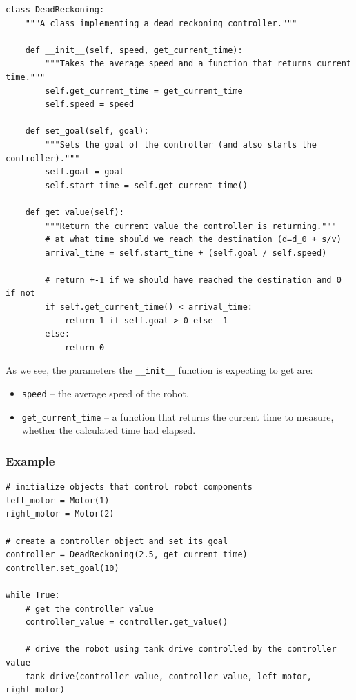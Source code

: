 \documentclass[12pt,twoside]{article}
\begin{document}
\begin{verbatim}
class DeadReckoning:
    """A class implementing a dead reckoning controller."""

    def __init__(self, speed, get_current_time):
        """Takes the average speed and a function that returns current time."""
        self.get_current_time = get_current_time
        self.speed = speed

    def set_goal(self, goal):
        """Sets the goal of the controller (and also starts the controller)."""
        self.goal = goal
        self.start_time = self.get_current_time()

    def get_value(self):
        """Return the current value the controller is returning."""
        # at what time should we reach the destination (d=d_0 + s/v)
        arrival_time = self.start_time + (self.goal / self.speed)

        # return +-1 if we should have reached the destination and 0 if not
        if self.get_current_time() < arrival_time:
            return 1 if self.goal > 0 else -1
        else:
            return 0
\end{verbatim}


As we see, the parameters the \texttt{\_\_init\_\_} function is expecting to get are:
\begin{itemize}
\item \texttt{speed} -- the average speed of the robot.
\item \texttt{get\_current\_time} -- a function that returns the current time to measure, whether the calculated time had elapsed.
\end{itemize}\vspace{\parskip}


\subsubsection{Example}
\begin{verbatim}
# initialize objects that control robot components
left_motor = Motor(1)
right_motor = Motor(2)

# create a controller object and set its goal
controller = DeadReckoning(2.5, get_current_time)
controller.set_goal(10)

while True:
    # get the controller value
    controller_value = controller.get_value()

    # drive the robot using tank drive controlled by the controller value
    tank_drive(controller_value, controller_value, left_motor, right_motor)
\end{verbatim}
\end{document}
